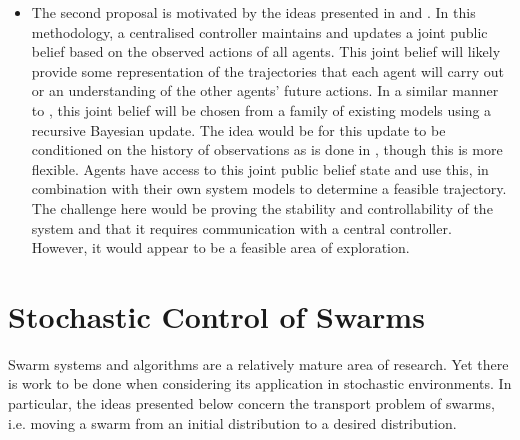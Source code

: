 \documentclass[preprint,11pt]{report}
\begin{document}
\begin{itemize}
	\item The second proposal is motivated by the ideas presented in \cite{Foerster} and 
	\cite{Heirung2019}. In this methodology, a centralised controller maintains and updates a joint
	public belief based on the observed actions of all agents. This joint belief will likely provide
	some representation of the trajectories that each agent will carry out or an understanding of
	the other agents' future actions. In a similar manner to \cite{Heirung2019}, this joint belief
	will be chosen from a family of existing models using a recursive Bayesian update. The idea
	would be for this update to be conditioned on the history of observations as is done in 
	\cite{Wingate2012}, though this is more flexible. Agents have access to this joint public belief
	state and use this, in combination with their own system models to determine a feasible
	trajectory. The challenge here would be proving the stability and controllability of the system
	and that it requires communication with a central controller. However, it would appear to be a
	feasible area of exploration.
\end{itemize}

\section{Stochastic Control of Swarms}

Swarm systems and algorithms are a relatively mature area of research. Yet there is work to be done
when considering its application in stochastic environments. In particular, the ideas presented
below concern the transport problem of swarms, i.e. moving a swarm from an initial distribution to a
desired distribution. 
\end{document}
